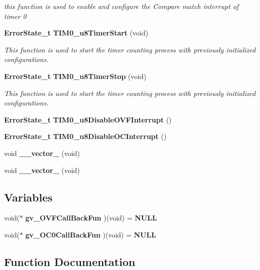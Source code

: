 \begin{DoxyCompactItemize}
\begin{DoxyCompactList}\small\item\em this function is used to enable and configure the Compare match interrupt of timer 0 \end{DoxyCompactList}\item 
\textbf{ Error\+State\+\_\+t} \textbf{ T\+I\+M0\+\_\+u8\+Timer\+Start} (void)
\begin{DoxyCompactList}\small\item\em This function is used to start the timer counting process with previously initialized configurations. \end{DoxyCompactList}\item 
\textbf{ Error\+State\+\_\+t} \textbf{ T\+I\+M0\+\_\+u8\+Timer\+Stop} (void)
\begin{DoxyCompactList}\small\item\em This function is used to start the timer counting process with previously initialized configurations. \end{DoxyCompactList}\item 
\textbf{ Error\+State\+\_\+t} \textbf{ T\+I\+M0\+\_\+u8\+Disable\+O\+V\+F\+Interrupt} ()
\item 
\textbf{ Error\+State\+\_\+t} \textbf{ T\+I\+M0\+\_\+u8\+Disable\+O\+C\+Interrupt} ()
\item 
void \textbf{ \+\_\+\+\_\+vector\+\_} (void)
\item 
void \textbf{ \+\_\+\+\_\+vector\+\_} (void)
\end{DoxyCompactItemize}
\subsection*{Variables}
\begin{DoxyCompactItemize}
\item 
void($\ast$ \textbf{ gv\+\_\+\+O\+V\+F\+Call\+Back\+Fun} )(void) =\textbf{ N\+U\+LL}
\item 
void($\ast$ \textbf{ gv\+\_\+\+O\+C0\+Call\+Back\+Fun} )(void) =\textbf{ N\+U\+LL}
\end{DoxyCompactItemize}


\subsection{Function Documentation}
\mbox{\label{_t_i_m_e_r0_8c_a74a0792c79b400c05d89ba6fccc8cd44}} 
